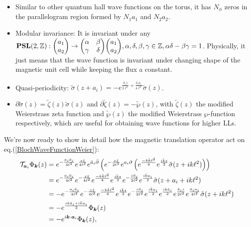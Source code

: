 \documentclass[%
nofootinbib,
 amsmath,amssymb,
 aps,onecolumn,
prb
]{revtex4-2}
\newcommand{\zz}{\bar{z}}
\newcommand{\tilsig}{\tilde{\sigma}}
\newcommand{\tilzeta}{\tilde{\zeta}}
\newcommand{\tilwp}{\tilde{\wp}}
\newcommand{\mT}{\mathcal{T}}
\begin{document}
\begin{itemize}
    \item Similar to other quantum hall wave functions on the torus, it has $N_\phi$ zeros in the parallelogram region formed by $N_1a_1$ and $N_2a_2$.
    \item Modular invariance: It is invariant under any $\mathbf{PSL}(2,\mathbb{Z}): \mqty(a_1 \\ a_2) \to \mqty(\alpha&\beta\\ \gamma &\delta)\mqty(a_1 \\ a_2),\alpha,\delta,\beta,\gamma\in\mathbb{Z}, \alpha\delta-\beta\gamma=1$. Physically, it just means that the wave function is invariant under changing shape of the
            magnetic unit cell while keeping the flux a constant.
    \item Quasi-periodicity: $\tilsig(z+a_i)=-e^{\frac{\bar{a}_iz}{2\ell^2}+\frac{\bar{a}_i a_i}{4\ell^2}}\tilsig(z)$.
    \item $\partial\tilsig(z)=\tilde{\zeta}(z)\tilsig(z)$ and $\partial\tilzeta(z)=-\tilwp(z)$, with $\tilzeta(z)$ the modified Weierstrass zeta function and $\tilwp(z)$ the modified Weierstrass $\wp$-function respectively, which are useful for obtaining wave functions for higher LLs.
\end{itemize}
We're now ready to show in detail how the magnetic translation operator act on eq.(\ref{BlochWaveFunctionWeier}):
\begin{align}\label{MTOActOnBasis}
    \mT_{\vb*{a}_i}\Phi_{\vb*{k}}(z)&=
    e^{-\frac{a_i\bar{a}_i}{4\ell^2}}e^{\frac{z\zz}{4\ell^2}}e^{\bar{a}_i \bar{\partial}}\left(e^{-\frac{z\zz}{2\ell^2}}e^{a_i\partial}\left(e^{\frac{-k\bar{k}\ell^2}{4}}e^{\frac{i\bar{k}z}{2}}\tilsig(z+ik\ell^2)\right)\right)\nonumber\\ 
    &=e^{-\frac{a_i\bar{a}_i}{4\ell^2}}e^{-\frac{z\zz}{4\ell^2}}e^{\frac{-k\bar{k}\ell^2}{4}}e^{\frac{i\bar{k}z}{2}}e^{-\frac{z\bar{a}_i}{2\ell^2}}e^{\frac{i\bar{k}a_i}{2}}\tilsig(z+a_i+ik\ell^2)\nonumber\\ 
    &=-e^{-\frac{a_i\bar{a}_i}{4\ell^2}}e^{-\frac{z\zz}{4\ell^2}}e^{\frac{-k\bar{k}\ell^2}{4}}e^{\frac{i\bar{k}z}{2}}e^{-\frac{z\bar{a}_i}{2\ell^2}}e^{\frac{i\bar{k}a_i}{2}}e^{\frac{ik\bar{a}_i}{2}}e^{\frac{\bar{a}_iz}{2\ell^2}}e^{\frac{\bar{a}_i a_i}{4\ell^2}}\tilsig(z+ik\ell^2)\nonumber\\ 
    &=-e^{\frac{ik\bar{a}_i+i\bar{k}a_i}{2}}\Phi_{\vb*{k}}(z)\nonumber\\ 
    &=-e^{i\vb*{k}\cdot\vb*{a}_i}\Phi_{\vb*{k}}(z),
\end{align}
\end{document}
